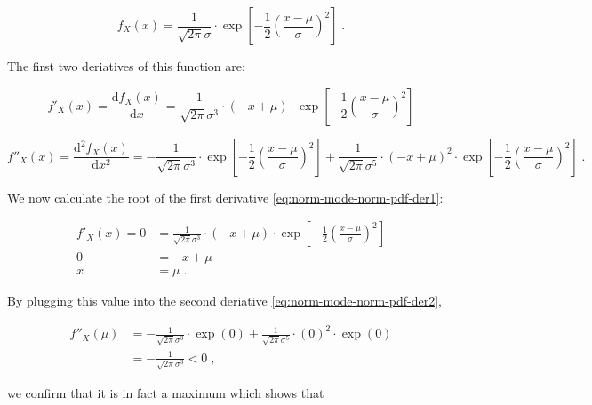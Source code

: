 \documentclass[a4paper,12pt,twoside]{book}
\begin{document}
\begin{equation} \label{eq:norm-mode-norm-pdf}
f_X(x) = \frac{1}{\sqrt{2 \pi} \sigma} \cdot \exp \left[ -\frac{1}{2} \left( \frac{x-\mu}{\sigma} \right)^2 \right] \; .
\end{equation}

The first two deriatives of this function are:

\begin{equation} \label{eq:norm-mode-norm-pdf-der1}
f'_X(x) = \frac{\mathrm{d}f_X(x)}{\mathrm{d}x} = \frac{1}{\sqrt{2 \pi} \sigma^3} \cdot (-x + \mu) \cdot \exp \left[ -\frac{1}{2} \left( \frac{x-\mu}{\sigma} \right)^2 \right]
\end{equation}

\begin{equation} \label{eq:norm-mode-norm-pdf-der2}
f''_X(x) = \frac{\mathrm{d}^2f_X(x)}{\mathrm{d}x^2} = -\frac{1}{\sqrt{2 \pi} \sigma^3} \cdot \exp \left[ -\frac{1}{2} \left( \frac{x-\mu}{\sigma} \right)^2 \right] + \frac{1}{\sqrt{2 \pi} \sigma^5} \cdot (-x + \mu)^2 \cdot \exp \left[ -\frac{1}{2} \left( \frac{x-\mu}{\sigma} \right)^2 \right] \; .
\end{equation}

We now calculate the root of the first derivative \eqref{eq:norm-mode-norm-pdf-der1}:

\begin{equation} \label{eq:norm-mode-norm-mode-s1}
\begin{split}
f'_X(x) = 0 &= \frac{1}{\sqrt{2 \pi} \sigma^3} \cdot (-x + \mu) \cdot \exp \left[ -\frac{1}{2} \left( \frac{x-\mu}{\sigma} \right)^2 \right] \\
0 &= -x + \mu \\
x &= \mu \; .
\end{split}
\end{equation}

By plugging this value into the second deriative \eqref{eq:norm-mode-norm-pdf-der2},

\begin{equation} \label{eq:norm-mode-norm-mode-s2}
\begin{split}
f''_X(\mu) &= -\frac{1}{\sqrt{2 \pi} \sigma^3} \cdot \exp(0) + \frac{1}{\sqrt{2 \pi} \sigma^5} \cdot (0)^2 \cdot \exp(0) \\
&= -\frac{1}{\sqrt{2 \pi} \sigma^3} < 0 \; ,
\end{split}
\end{equation}

we confirm that it is in fact a maximum which shows that
\end{document}
